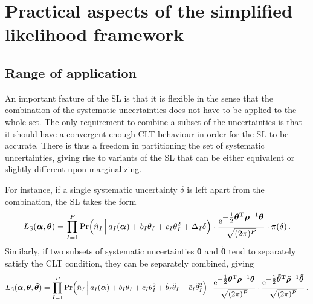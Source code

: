 \documentclass[11pt]{article}
\newcommand{\be}{\begin{equation}}
\newcommand{\ee}{\end{equation}}
\begin{document}
\section{Practical aspects of the simplified likelihood framework}
\label{se:practice}

\subsection{Range of application}

An important feature of the SL is that it is flexible in the sense that the combination of the systematic uncertainties does not have to be applied to the whole set.  The only requirement to combine a subset of the  uncertainties is that it should have a convergent enough  CLT behaviour in order  for the SL to be accurate. There is thus a freedom in partitioning the set of systematic uncertainties, giving rise to variants of the SL that can be either equivalent or slightly different upon  marginalizing.


For instance, if a single systematic uncertainty $\delta$ is left apart from the combination, the SL takes the form
\be
 L_{\rm{S}}(\bm{\alpha},\bm{\theta}) = \prod_{I=1}^P \mathrm{Pr}\Big( \hat{n}_I\,\Big|\,a_{I}(\bm{\alpha})+b_I\theta_I+c_I\theta_I^2 + \Delta_I  \delta   \Big) \cdot
    \frac{ \mathrm{e}^{{\textstyle-\frac{1}{2}\bm \theta^{\rm T} \bm{\rho}^{-1} \bm \theta}}}{\sqrt{(2\pi)^P }}
    \cdot \pi(\delta) \,. \label{eq:SL_variants1}
\ee
Similarly, if two subsets of systematic uncertainties $\bm{\theta}$ and $\bm{\tilde \theta}$ tend to  separately satisfy the CLT condition,  they can be separately combined, giving  
\be
 L_{\rm{S}}(\bm{\alpha},\bm{\theta},\bm{\tilde \theta}) = \prod_{I=1}^P \mathrm{Pr}\Big( \hat{n}_I\,\Big|\,a_{I}(\bm{\alpha})+b_I\theta_I+c_I\theta_I^2 + \tilde b_I \tilde \theta_I+ \tilde c_I \tilde \theta_I^2  \Big) \cdot
    \frac{ \mathrm{e}^{{\textstyle-\frac{1}{2}\bm \theta^{\rm T} \bm{\rho}^{-1} \bm \theta}}}{\sqrt{(2\pi)^P }}
\cdot \frac{ \mathrm{e}^{{\textstyle-\frac{1}{2}\bm{ \tilde\theta^{\rm T}} \bm{\tilde \rho}^{-1} \bm{ \tilde\theta}}}}{\sqrt{(2\pi)^P }}
      \,. \label{eq:SL_variants2}
\ee
\end{document}
